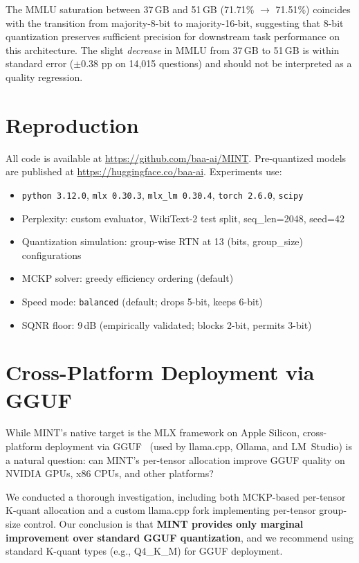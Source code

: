 \documentclass{article}
\begin{document}
The MMLU saturation between 37\,GB and 51\,GB (71.71\% $\rightarrow$ 71.51\%) coincides with the transition from majority-8-bit to majority-16-bit, suggesting that 8-bit quantization preserves sufficient precision for downstream task performance on this architecture. The slight \emph{decrease} in MMLU from 37\,GB to 51\,GB is within standard error ($\pm$0.38 pp on 14{,}015 questions) and should not be interpreted as a quality regression.

\section{Reproduction}
\label{app:reproduction}

All code is available at \url{https://github.com/baa-ai/MINT}. Pre-quantized models are published at \url{https://huggingface.co/baa-ai}. Experiments use:
\begin{itemize}
    \item \texttt{python 3.12.0}, \texttt{mlx 0.30.3}, \texttt{mlx\_lm 0.30.4}, \texttt{torch 2.6.0}, \texttt{scipy}
    \item Perplexity: custom evaluator, WikiText-2 test split, seq\_len=2048, seed=42
    \item Quantization simulation: group-wise RTN at 13 (bits, group\_size) configurations
    \item MCKP solver: greedy efficiency ordering (default)
    \item Speed mode: \texttt{balanced} (default; drops 5-bit, keeps 6-bit)
    \item SQNR floor: 9\,dB (empirically validated; blocks 2-bit, permits 3-bit)
\end{itemize}

\section{Cross-Platform Deployment via GGUF}
\label{sec:cross_platform}

While MINT's native target is the MLX framework on Apple Silicon, cross-platform deployment via GGUF~\cite{ggml} (used by llama.cpp, Ollama, and LM~Studio) is a natural question: can MINT's per-tensor allocation improve GGUF quality on NVIDIA GPUs, x86 CPUs, and other platforms?

We conducted a thorough investigation, including both MCKP-based per-tensor K-quant allocation and a custom llama.cpp fork implementing per-tensor group-size control. Our conclusion is that \textbf{MINT provides only marginal improvement over standard GGUF quantization}, and we recommend using standard K-quant types (e.g., Q4\_K\_M) for GGUF deployment.
\end{document}
